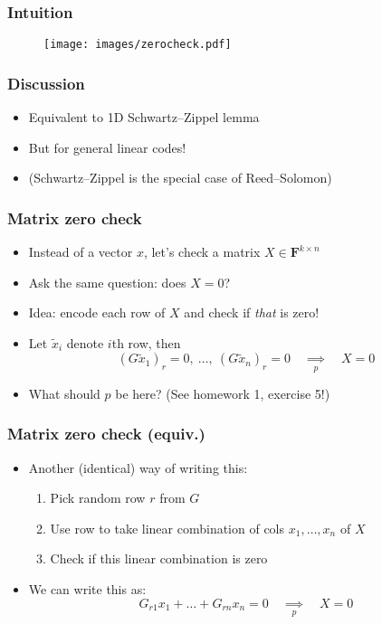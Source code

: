 \documentclass{beamer}
\newcommand{\field}{\mathbf{F}}
\newcommand{\impliesn}[1]{\underset{#1}{\implies}}
\newcommand{\impliesp}{\impliesn{p}}
\begin{document}
    \begin{frame}
        \frametitle{Intuition}
        \begin{figure}
            \centering
            \texttt{[image: images/zerocheck.pdf]}
        \end{figure}
    \end{frame}

    \begin{frame}
        \frametitle{Discussion}
        \begin{itemize}\itemsep=12pt
            \item Equivalent to 1D Schwartz--Zippel lemma
            \item But for general linear codes!
            \item (Schwartz--Zippel is the special case of Reed--Solomon)
        \end{itemize}
    \end{frame}

    \begin{frame}
        \frametitle{Matrix zero check}
        \begin{itemize}\itemsep=12pt
            \item Instead of a vector $x$, let's check a matrix $X \in \field^{k \times n}$
            \item Ask the same question: does $X = 0$?
            \pause
            \item Idea: encode each row of $X$ and check if \emph{that} is zero!
            \pause
            \item Let $\tilde x_i$ denote $i$th row, then
            \[
                (G\tilde x_1)_r = 0, ~ \dots, ~ (G\tilde x_n)_r = 0\quad  \impliesp \quad X = 0
            \]
            \vspace{-2em}
            \pause
            \item What should $p$ be here? (See homework 1, exercise 5!)
        \end{itemize}
    \end{frame}


    \begin{frame}
        \frametitle{Matrix zero check (equiv.)}
        \begin{itemize}\itemsep=12pt
            \item Another (identical) way of writing this:
            \begin{enumerate}\itemsep=8pt
                \item Pick random row $r$ from $G$
                \item Use row to take linear combination of cols $x_1, \dots, x_n$ of $X$
                \item Check if this linear combination is zero
            \end{enumerate}
            \pause
            \item We can write this as:
            \[
                G_{r1}x_1 + \dots + G_{rn} x_n = 0 \quad \impliesp \quad X = 0
            \]
        \end{itemize}
    \end{frame}
\end{document}
